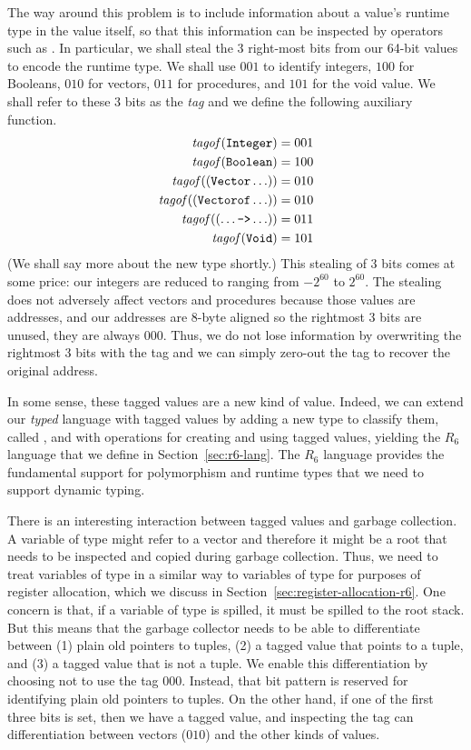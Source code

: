 \documentclass[11pt]{book}
\begin{document}
The way around this problem is to include information about a value's
runtime type in the value itself, so that this information can be
inspected by operators such as .  In particular, we shall
steal the 3 right-most bits from our 64-bit values to encode the
runtime type.  We shall use $001$ to identify integers, $100$ for
Booleans, $010$ for vectors, $011$ for procedures, and $101$ for the
void value. We shall refer to these 3 bits as the \emph{tag} and we
define the following auxiliary function.
\begin{align*}
\mathit{tagof}(\texttt{Integer}) &= 001 \\
\mathit{tagof}(\texttt{Boolean}) &= 100 \\
\mathit{tagof}((\texttt{Vector} \ldots)) &= 010 \\
\mathit{tagof}((\texttt{Vectorof} \ldots)) &= 010 \\
\mathit{tagof}((\ldots \texttt{->} \ldots)) &= 011 \\
\mathit{tagof}(\texttt{Void}) &= 101
\end{align*}
(We shall say more about the new  type shortly.)
This stealing of 3 bits comes at some
price: our integers are reduced to ranging from $-2^{60}$ to
$2^{60}$. The stealing does not adversely affect vectors and
procedures because those values are addresses, and our addresses are
8-byte aligned so the rightmost 3 bits are unused, they are always
$000$. Thus, we do not lose information by overwriting the rightmost 3
bits with the tag and we can simply zero-out the tag to recover the
original address.

In some sense, these tagged values are a new kind of value.  Indeed,
we can extend our \emph{typed} language with tagged values by adding a
new type to classify them, called , and with operations for
creating and using tagged values, yielding the $R_6$ language that we
define in Section~\ref{sec:r6-lang}. The $R_6$ language provides the
fundamental support for polymorphism and runtime types that we need to
support dynamic typing.

There is an interesting interaction between tagged values and garbage
collection.  A variable of type  might refer to a vector and
therefore it might be a root that needs to be inspected and copied
during garbage collection. Thus, we need to treat variables of type
 in a similar way to variables of type  for
purposes of register allocation, which we discuss in
Section~\ref{sec:register-allocation-r6}. One concern is that, if a
variable of type  is spilled, it must be spilled to the root
stack.  But this means that the garbage collector needs to be able to
differentiate between (1) plain old pointers to tuples, (2) a tagged
value that points to a tuple, and (3) a tagged value that is not a
tuple. We enable this differentiation by choosing not to use the tag
$000$. Instead, that bit pattern is reserved for identifying plain old
pointers to tuples. On the other hand, if one of the first three bits
is set, then we have a tagged value, and inspecting the tag can
differentiation between vectors ($010$) and the other kinds of values.
\end{document}
